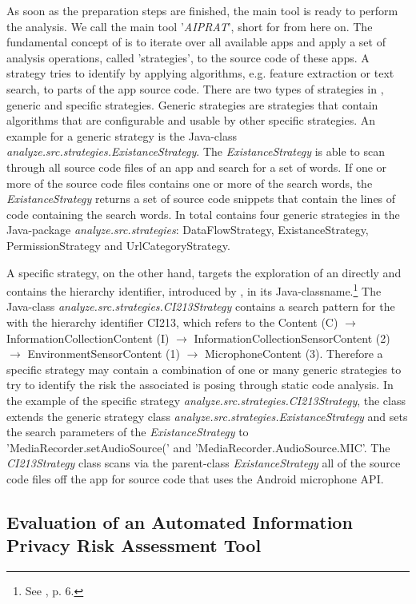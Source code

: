 As soon as the preparation steps are finished, the main \sca tool is ready to perform the \ipr analysis.
We call the main \sca tool '\textit{AIPRAT}', short for \aiprat from here on.
The fundamental concept of \AIPRAT is to iterate over all available apps and apply a set of analysis operations, called 'strategies', to the source code of these apps.
A strategy tries to identify \iprfs by applying algorithms, e.g. feature extraction or text search, to parts of the app source code.
There are two types of strategies in \AIPRAT, generic and specific strategies.
Generic strategies are strategies that contain algorithms that are configurable and usable by other specific strategies.
An example for a generic strategy is the Java-class \textit{analyze.src.strategies.ExistanceStrategy}. 
The \textit{ExistanceStrategy} is able to scan through all source code files of an app and search for a set of words.
If one or more of the source code files contains one or more of the search words, the \textit{ExistanceStrategy} returns a set of source code snippets that contain the lines of code containing the search words.
In total \AIPRAT contains four generic strategies in the Java-package \textit{analyze.src.strategies}: DataFlowStrategy, ExistanceStrategy, PermissionStrategy and UrlCategoryStrategy.


A specific strategy, on the other hand, targets the exploration of an \ipp directly and contains the \ipp hierarchy identifier, introduced by \textcite{Dehling2016}, in its Java-classname.\footnote{See \cite{Dehling2016}, p. 6.}
The Java-class \textit{analyze.src.strategies.CI213\textunderscore Strategy} contains a search pattern for the \ipp with the hierarchy identifier CI213, which refers to the \ipp Content (C) $\rightarrow$ InformationCollectionContent (I) $\rightarrow$ InformationCollectionSensorContent (2) $\rightarrow$ EnvironmentSensorContent (1) $\rightarrow$ MicrophoneContent (3).
Therefore a specific strategy may contain a combination of one or many generic strategies to try to identify the risk the associated \ipp is posing through static code analysis.
In the example of the specific strategy \textit{analyze.src.strategies.CI213\textunderscore Strategy}, the class extends the generic strategy class \textit{analyze.src.strategies.ExistanceStrategy} and sets the search parameters of the \textit{ExistanceStrategy} to 'MediaRecorder.setAudioSource(' and 'MediaRecorder.AudioSource.MIC'.
The \textit{CI213\textunderscore Strategy} class scans via the parent-class \textit{ExistanceStrategy} all of the source code files off the app for source code that uses the Android microphone \acs{API}.


\subsection{Evaluation of an Automated Information Privacy Risk Assessment Tool}